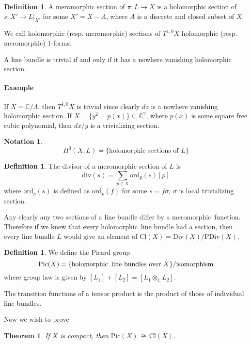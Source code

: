 \documentclass[12pt]{article}
\theoremstyle{plain}
\newtheorem{theorem}[equation]{Theorem}
\theoremstyle{definition}
\newtheorem{definition}[equation]{Definition}
\newtheorem{notation}[equation]{Notation}
\newcommand{\IC}{\mathbb{C}}
\newcommand\iso{{\, \cong \,}}
\newcommand\tensor{{\otimes}}
\newcommand{\<}{\langle}
\renewcommand{\>}{\rangle}
\newcommand{\ord}{\mathrm{ord}}
\newcommand{\Div}{\mathrm{Div}}
\newcommand{\PDiv}{\mathrm{PDiv}}
\renewcommand{\div}{\mathrm{div}}
\newcommand{\Cl}{\mathrm{Cl}}
\newcommand{\Pic}{\mathrm{Pic}}
\newcommand{\holo}{holomorphic \,}
\newcommand{\mero}{meromorphic \,}
\begin{document}
\begin{definition}
A meromorphic section of $\pi: L \to X$ is a holomorphic section of $s : X' \to L|_{X'}$ for some $X' = X - A$, where $A$ is a discrete and closed subset of $X$. 
\end{definition}

We call holomorphic (resp. meromorphic) sections of $T^{1, 0} X$ holomorphic (resp. meromorphic) 1-forms. 

A line bundle is trivial if and only if it has a nowhere vanishing holomorphic section. 

\paragraph{Example} If $X = \IC/\Lambda$, then $T^{1, 0}X$ is trivial since clearly $dz$ is a nowhere vanishing holomorphic section. If $X = \{ y^2 = p(x) \} \subseteq \IC^2$, where $p(x)$ is some square free cubic polynomial, then $dx/y$ is a trivializing section. 

\begin{notation}
$$H^0(X, L) = \{ \text{holomorphic sections of } L \}$$
\end{notation} 

\begin{definition}
The divisor of a meromorphic section of $L$ is 
$$ \div(s) = \sum_{ p \in X} \ord_p (s) [p] $$ 
where $\ord_p(s)$ is defined as $\ord_p(f)$ for some $s = f \sigma$, $\sigma$ is local trivializing section. 
\end{definition} 

Any clearly any two sections of a line bundle differ by a \mero function. Therefore if we knew that every \holo line bundle had a section, then every line bundle $L$ would give an element of $\Cl(X) = \Div(X)/\PDiv(X)$. 

\begin{definition}
We define the Picard group 
$$\Pic(X) = \{ \text{\holo line bundles over }X\}/\text{isomorphism} $$
where group law is given by $[L_1] + [L_2] = [L_1 \tensor_\IC L_2]$. 
\end{definition}

The transition functions of a tensor product is the product of those of individual line bundles. 

Now we wish to prove 
\begin{theorem}
If $X$ is compact, then $\Pic(X) \iso \Cl(X)$. 
\end{theorem}
\end{document}
